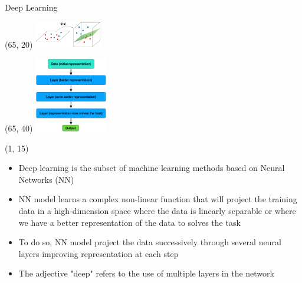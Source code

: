   \begin{frame}{Deep Learning}  

    \begin{textblock}{40}(65, 20)
        \includegraphics[width=110px]{img/projection.png}
    \end{textblock}
    \begin{textblock}{40}(65, 40)
    \includegraphics[width=120px]{img/projection_dl.png}
    \end{textblock}

    
    \begin{textblock}{60}(1, 15)
        \begin{itemize}
            \item Deep learning is the subset of machine learning methods based on Neural Networks (NN)
            \item NN model learns a complex non-linear function that will project the training data in a high-dimension space where the data is linearly separable or where we have a better representation of the data to solves the task
            \item To do so, NN model project the data successively through several neural layers improving representation at each step
            \item The adjective "deep" refers to the use of multiple layers in the network
          \end{itemize}
    \end{textblock}
  
  
  \end{frame}

